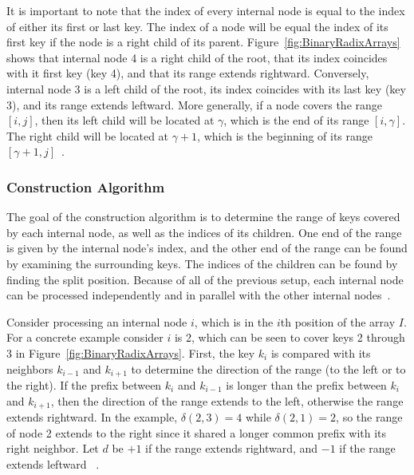 \documentclass{sig-alternate}
\begin{document}
It is important to note that the index of every internal node is equal to the index of either its first or last key. The index of a node will be equal the index of its first key if the node is a right child of its parent. Figure~\ref{fig:BinaryRadixArrays} shows that internal node 4 is a right child of the root, that its index coincides with it first key (key 4), and that its range extends rightward. Conversely, internal node 3 is a left child of the root, its index coincides with its last key (key 3), and its range extends leftward. More generally, if a node covers the range $[i,j]$, then its left child will be located at $\gamma$, which is the end of its range $[i,\gamma]$. The right child will be located at $\gamma+1$, which is the beginning of its range $[\gamma+1,j]$~\cite{Karras:2012}.

\subsubsection{Construction Algorithm}
\label{sec:algorithm}

The goal of the construction algorithm is to determine the range of keys covered by each internal node, as well as the indices of its children. One end of the range is given by the internal node's index, and the other end of the range can be found by examining the surrounding keys. The indices of the children can be found by finding the split position. Because of all of the previous setup, each internal node can be processed independently and in parallel with the other internal nodes~\cite{Karras:2012}.

Consider processing an internal node $i$, which is in the $i$th position of the array $I$. For a concrete example consider $i$ is 2, which can be seen to cover keys 2 through 3 in Figure~\ref{fig:BinaryRadixArrays}. First, the key $k_i$ is compared with its neighbors $k_{i-1}$ and $k_{i+1}$ to determine the direction of the range (to the left or to the right). If the prefix between $k_i$ and $k_{i-1}$ is longer than the prefix between $k_i$ and $k_{i+1}$, then the direction of the range extends to the left, otherwise the range extends rightward. In the example, $\delta(2,3) = 4$ while $\delta(2,1) = 2$, so the range of node 2 extends to the right since it shared a longer common prefix with its right neighbor. Let $d$ be $+1$ if the range extends rightward, and $-1$ if the range extends leftward ~\cite{Karras:2012}.
\end{document}
